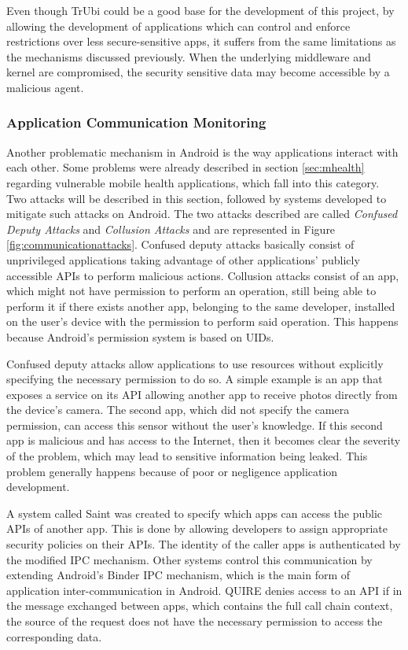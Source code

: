 Even though TrUbi could be a good base for the development of this project, by allowing the development of applications which can control and enforce restrictions over less secure-sensitive apps, it suffers from the same limitations as the mechanisms discussed previously. When the underlying middleware and kernel are compromised, the security sensitive data may become accessible by a malicious agent.

\subsubsection{Application Communication Monitoring}
\label{sec:appcommmonitoring}

Another problematic mechanism in Android is the way applications interact with each other. Some problems were already described in section \ref{sec:mhealth} regarding vulnerable mobile health applications, which fall into this category. Two attacks will be described in this section, followed by systems developed to mitigate such attacks on Android. The two attacks described are called \emph{Confused Deputy Attacks} and \emph{Collusion Attacks} and are represented in Figure \ref{fig:communicationattacks}. Confused deputy attacks basically consist of unprivileged applications taking advantage of other applications’ publicly accessible APIs to perform malicious actions. Collusion attacks consist of an app, which might not have permission to perform an operation, still being able to perform it if there exists another app, belonging to the same developer, installed on the user’s device with the permission to perform said operation. This happens because Android’s permission system is based on UIDs.

Confused deputy attacks allow applications to use resources without explicitly specifying the necessary permission to do so. A simple example is an app that exposes a service on its API allowing another app to receive photos directly from the device's camera. The second app, which did not specify the camera permission, can access this sensor without the user's knowledge. If this second app is malicious and has access to the Internet, then it becomes clear the severity of the problem, which may lead to sensitive information being leaked. This problem generally happens because of poor or negligence application development.

A system  called Saint \cite{ongtang2012semantically} was created to specify which apps can access the public APIs of another app. This is done by allowing developers to assign appropriate security policies on their APIs. The identity of the caller apps is authenticated by the modified \ac{IPC} mechanism. Other systems control this communication by extending Android’s Binder \ac{IPC} mechanism, which is the main form of application inter-communication in Android. QUIRE \cite{dietz2011quire} denies access to an API if in the message exchanged between apps, which contains the full call chain context, the source of the request does not have the necessary permission to access the corresponding data.

